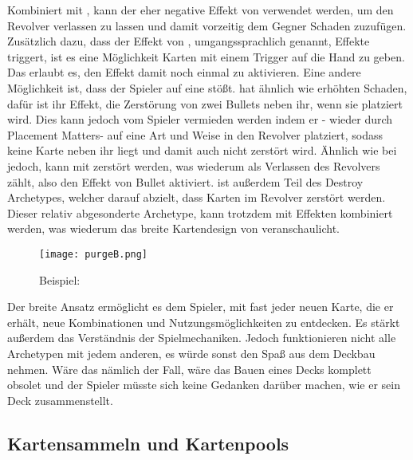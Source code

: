 Kombiniert mit , kann der eher negative Effekt von  verwendet werden, um
 den Revolver verlassen zu lassen und damit vorzeitig dem Gegner Schaden zuzufügen.
Zusätzlich dazu, dass der Effekt von , umgangssprachlich  genannt,  Effekte triggert,
ist es eine Möglichkeit Karten mit einem  Trigger auf die Hand zu geben. Das erlaubt es, den Effekt damit noch einmal zu aktivieren.
Eine andere Möglichkeit ist, dass der Spieler auf eine  stößt.  hat ähnlich wie 
erhöhten Schaden, dafür ist ihr Effekt, die Zerstörung von zwei Bullets neben ihr, wenn sie platziert wird.
Dies kann jedoch vom Spieler vermieden werden indem er - wieder durch Placement Matters-  auf eine Art und
Weise in den Revolver platziert, sodass keine Karte neben ihr liegt und damit auch nicht zerstört wird.
Ähnlich wie bei  jedoch, kann  mit  zerstört werden, was wiederum als
Verlassen des Revolvers zählt, also den Effekt von  Bullet aktiviert.  ist außerdem Teil
des Destroy Archetypes, welcher darauf abzielt, dass Karten im Revolver zerstört werden.
Dieser relativ abgesonderte Archetype, kann trotzdem mit  Effekten kombiniert werden, was wiederum das breite
Kartendesign von \FF veranschaulicht.

\begin{figure}[H]
    \centering
    \texttt{[image: purgeB.png]}
    \caption{Beispiel: }
\end{figure}


Der breite Ansatz ermöglicht es dem Spieler, mit fast jeder neuen Karte, die er erhält, neue Kombinationen und Nutzungsmöglichkeiten zu entdecken.
Es stärkt außerdem das Verständnis der Spielmechaniken.
Jedoch funktionieren nicht alle \FF Archetypen mit jedem anderen, es würde sonst den Spaß aus dem Deckbau nehmen.
Wäre das nämlich der Fall, wäre das Bauen eines Decks komplett obsolet und der Spieler müsste sich keine Gedanken darüber machen, wie er sein Deck zusammenstellt.



\subsection{Kartensammeln und Kartenpools}\label{subsec:placementMatters}

